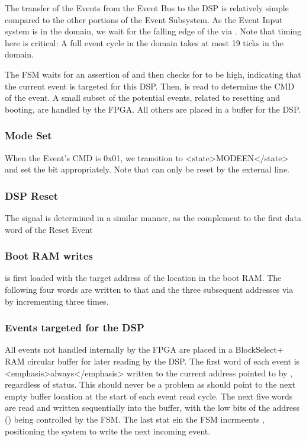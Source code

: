 The transfer of the Events from the Event Bus to the DSP is relatively
simple compared to the other portions of the Event Subsystem. As the
Event Input system is in the  domain, we wait
for the falling edge of the  via
. Note that timing here is critical: A full
event cycle in the  domain takes at most 19
ticks in the  domain.
      
The FSM waits for an assertion of  and then
checks for  to be high, indicating that the
current event is targeted for this DSP. Then,
 is read to determine the CMD of the event.
A small subset of the potential events, related to resetting and
booting, are handled by the FPGA. All others are placed in a buffer
for the DSP.

\subsubsection{Mode Set}

When the Event's CMD is 0x01, we transition to <state>MODEEN</state>
and set the  bit appropriately. Note that
 can only be reset by the external
 line.

      
\subsubsection{DSP Reset}

The  signal is determined in a similar
manner, as the complement to the first data word of the Reset Event


\subsubsection{Boot RAM writes}


 is first loaded with the target address
of the location in the boot RAM. The following four words are written
to that and the three subsequent addresses via
 by incrementing
 three times.


\subsubsection{Events targeted for the DSP}

All events not handled internally by the FPGA are placed in a
BlockSelect+ RAM circular buffer for later reading by the DSP. The
first word of each event is <emphasis>always</emphasis> written to the
current address pointed to by , regardless
of  status. This should never be a problem as
 should point to the next empty buffer
location at the start of each event read cycle. The next five words
are read and written sequentially into the buffer, with the low bits
of the address () being controlled by the
FSM. The last stat ein the FSM incrmeents ,
positioning the system to write the next incoming event.

